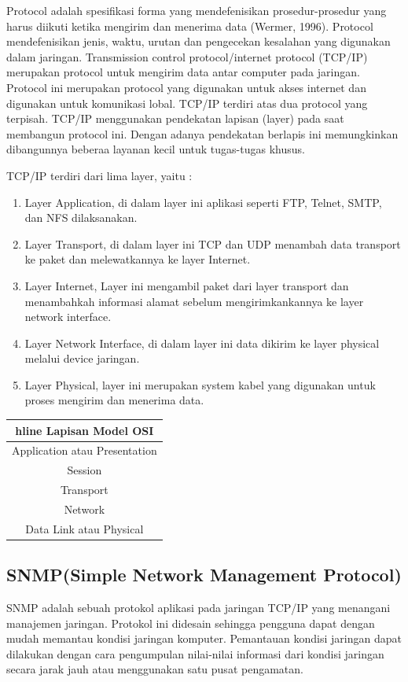 Protocol adalah spesifikasi forma yang mendefenisikan prosedur-prosedur yang harus diikuti ketika mengirim dan menerima data (Wermer, 
1996). Protocol mendefenisikan jenis, waktu, urutan dan pengecekan kesalahan yang digunakan dalam jaringan. Transmission control 
protocol/internet protocol (TCP/IP) merupakan protocol untuk mengirim data antar computer pada jaringan. Protocol ini merupakan protocol 
yang digunakan untuk akses internet dan digunakan untuk komunikasi lobal. TCP/IP terdiri atas dua protocol yang terpisah. TCP/IP 
menggunakan pendekatan lapisan (layer) pada saat membangun protocol ini. Dengan adanya pendekatan berlapis ini memungkinkan dibangunnya 
beberaa layanan kecil untuk tugas-tugas khusus.

TCP/IP terdiri dari lima layer, yaitu :
\begin{enumerate}
\item   Layer Application, di dalam layer ini aplikasi seperti FTP, Telnet, SMTP, dan NFS dilaksanakan.
\item   Layer Transport, di dalam layer ini TCP dan UDP menambah data transport ke paket dan melewatkannya ke layer Internet.
\item    Layer Internet, Layer ini mengambil paket dari layer transport dan menambahkah informasi alamat sebelum mengirimkankannya ke layer network interface.
\item     Layer Network Interface, di dalam layer ini data dikirim ke layer physical melalui device jaringan.
\item     Layer Physical, layer ini merupakan system kabel yang digunakan untuk proses mengirim dan menerima data.
\end{enumerate}

\begin{table} [H]
\begin {tabular} {|c|}
hline
Lapisan Model OSI \\
\hline
Application atau Presentation & \\
Session & \\
Transport & \\
Network & \\
Data Link atau Physical & \\
\hline
\end{tabular}
\end{table} 
  
 \subsection{SNMP(Simple Network Management Protocol)}
SNMP adalah sebuah protokol aplikasi pada jaringan TCP/IP yang menangani manajemen jaringan. 
Protokol ini didesain sehingga pengguna dapat dengan mudah memantau kondisi jaringan komputer. 
Pemantauan kondisi jaringan dapat dilakukan dengan cara pengumpulan nilai-nilai informasi dari kondisi jaringan secara jarak jauh atau menggunakan satu pusat pengamatan.
  
